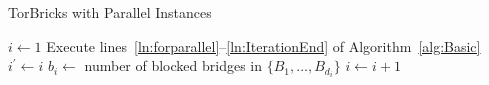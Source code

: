 \documentclass[a4paper,UKenglish]{lipics-v2016}
\newcommand{\algFont}{\fontsize{10}{13}\selectfont}
\newcommand{\bricks}{}
\def\bricks/{\mbox{TorBricks}}
\begin{document}
\begin{algorithm}
	\caption{\bricks/ with Parallel Instances}
	\label{alg:parallel}
	\vspace{0.4em}
		
	\algFont \vspace{2pt}
	\begin{algorithmic}[1]
		\State ${i \gets 1}$ 
		\While{\True}
			\State Execute lines~\ref{ln:forparallel}--\ref{ln:IterationEnd} of Algorithm~\ref{alg:Basic}
			\State $i^\prime \gets i$
			 
				\State $b_i \gets$ number of blocked bridges in $\{B_1, ..., B_{d_i}\}$
			\EndWhile
				\State $i \gets i+1$	\label{ln:critical}
			\EndIf
		\EndWhile
	\end{algorithmic}	
\end{algorithm}
\end{document}
